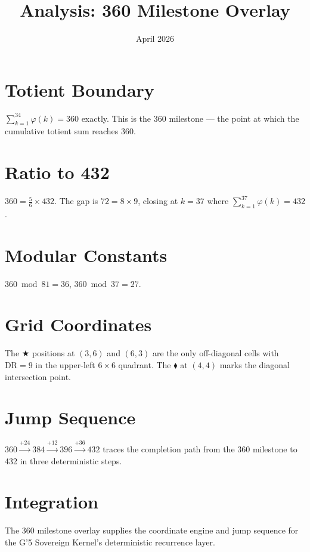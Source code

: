 \documentclass{article}
\title{Analysis: 360 Milestone Overlay}
\date{April 2026}
\begin{document}
\maketitle

\section{Totient Boundary}
$\sum_{k=1}^{34}\varphi(k) = 360$ exactly. This is the 360 milestone — the point at which the cumulative totient sum reaches 360.

\section{Ratio to 432}
$360 = \frac{5}{6} \times 432$. The gap is $72 = 8 \times 9$, closing at $k=37$ where $\sum_{k=1}^{37}\varphi(k)=432$.

\section{Modular Constants}
$360 \bmod 81 = 36$, $360 \bmod 37 = 27$.

\section{Grid Coordinates}
The $\bigstar$ positions at $(3,6)$ and $(6,3)$ are the only off-diagonal cells with $\mathrm{DR}=9$ in the upper-left $6\times6$ quadrant. The $\blacklozenge$ at $(4,4)$ marks the diagonal intersection point.

\section{Jump Sequence}
$360 \xrightarrow{+24} 384 \xrightarrow{+12} 396 \xrightarrow{+36} 432$ traces the completion path from the 360 milestone to 432 in three deterministic steps.

\section{Integration}
The 360 milestone overlay supplies the coordinate engine and jump sequence for the G'5 Sovereign Kernel's deterministic recurrence layer.
\end{document}
